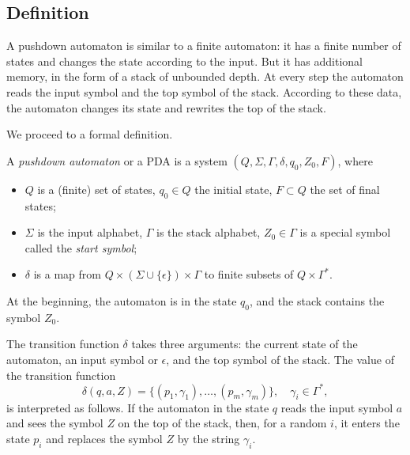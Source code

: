\begin{page}
\setcounter{section}{6}
\setcounter{subsection}{1}
\setcounter{dfn}{0}
\label{portion:1246}

\subsection{Definition}
A pushdown automaton is similar to a finite automaton:
it has a finite number of states and changes the state according to the input.
But it has additional memory, in the form of a stack of unbounded depth.
At every step the automaton reads the input symbol and the top symbol of the stack.
According to these data, the automaton changes its state and rewrites the top of the stack.

We proceed to a formal definition.

\end{page}

\begin{page}
\setcounter{section}{6}
\setcounter{subsection}{1}
\setcounter{dfn}{1}
\label{portion:1248}

\begin{dfn}
A \emph{pushdown automaton} or a PDA is a system $(Q, \Sigma, \Gamma, \delta, q_0, Z_0, F)$, where
\begin{itemize}
\item
$Q$ is a (finite) set of states, $q_0 \in Q$ the initial state, $F \subset Q$ the set of final states;
\item
$\Sigma$ is the input alphabet, $\Gamma$ is the stack alphabet, $Z_0 \in \Gamma$ is a special symbol called the \emph{start symbol};
\item
$\delta$ is a map from $Q \times (\Sigma \cup \{\epsilon\}) \times \Gamma$ to finite subsets of $Q \times \Gamma^*$.
\end{itemize}
\end{dfn}

\end{page}

\begin{page}
\setcounter{section}{6}
\setcounter{subsection}{1}
\setcounter{dfn}{1}
\label{portion:1249}

At the beginning, the automaton is in the state $q_0$, and the stack contains the symbol $Z_0$.

The transition function $\delta$ takes three arguments:
the current state of the automaton, an input symbol or $\epsilon$, and the top symbol of the stack.
The value of the transition function
\[
\delta(q, a, Z) = \{(p_1, \gamma_1), \ldots, (p_m, \gamma_m)\}, \quad \gamma_i \in \Gamma^*,
\]
is interpreted as follows.
If the automaton in the state $q$ reads the input symbol $a$ and sees the symbol $Z$ on the top of the stack,
then, for a random $i$, it enters the state $p_i$ and replaces the symbol $Z$ by the string $\gamma_i$.


\end{page}

